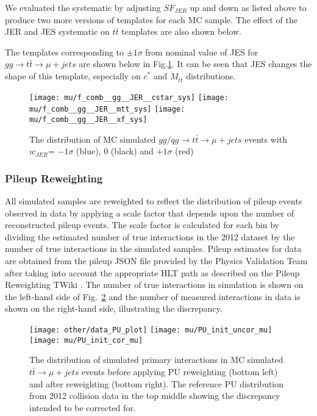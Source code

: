 We evaluated the systematic by adjusting $SF_{JER}$ up and down as listed above to produce two more versions of templates for each MC sample. The effect of the JER and JES systematic on $t\bar{t}$ templates are also shown below.

The templates corresponding to $\pm 1\sigma$ from nominal value of JES for $gg\rightarrow t\bar{t}\rightarrow \mu+jets$ are shown below in Fig.\ref{fig:gg_JER_templates}. It can be seen that JES changes the shape of this template, especially on $c^*$ and $M_{t\bar{t}}$ distributions.

\begin{figure}[hbt]
  \begin{center}
    \texttt{[image: mu/f\_comb\_\_gg\_\_JER\_\_cstar\_sys]}
    \texttt{[image: mu/f\_comb\_\_gg\_\_JER\_\_mtt\_sys]}
    \texttt{[image: mu/f\_comb\_\_gg\_\_JER\_\_xf\_sys]}

  \caption{\small The distribution of MC simulated $gg/qg\rightarrow t\bar{t}\rightarrow \mu+jets$ events with $w_{JER}$= $-1\sigma$ (blue), 0 (black) and $+1\sigma$ (red)}
    \label{fig:gg_JER_templates}
  \end{center}
\end{figure}



\subsubsection{Pileup Reweighting}

All simulated samples are reweighted to reflect the distribution of pileup events observed in data by applying a scale factor that depends upon the number of reconstructed pileup events. The scale factor is calculated for each bin by dividing the estimated number of true interactions in the 2012 dataset by the number of true interactions in the simulated samples. Pileup estimates for data are obtained from the pileup JSON file provided by the Physics Validation Team after taking into account the appropriate HLT path as described on the Pileup Reweighting TWiki \cite{pileup_reweighting_twiki}. The number of true interactions in simulation is shown on the left-hand side of Fig.~\ref{fig:MC_and_data_pileup} and the number of measured interactions in data is shown on the right-hand side, illustrating the discrepancy.

\begin{figure}[hbt]
  \begin{center}
    \texttt{[image: other/data\_PU\_plot]}  
    \texttt{[image: mu/PU\_init\_uncor\_mu]}
    \texttt{[image: mu/PU\_init\_cor\_mu]}
  \caption{\small The distribution of simulated primary interactions in MC simulated $t\bar{t}\rightarrow \mu +jets$ events before applying PU reweighting (bottom left) and after reweighting (bottom right). The reference PU distribution from 2012 collision data in the top middle showing the discrepancy intended to be corrected for. }
    \label{fig:MC_and_data_pileup}
  \end{center}
\end{figure}

